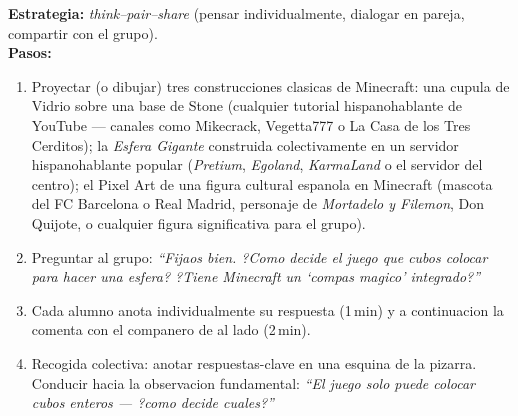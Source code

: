 \documentclass[12pt,a4paper]{scrartcl}
\newcommand{\tempo}[1]{\textnormal{\footnotesize\color{bg!90!white}\textsf{#1}}}
\begin{document}
\begin{actividad}[1.1 --- Movilizacion \quad\tempo{10 min}]
\textbf{Estrategia:} \emph{think--pair--share} (pensar individualmente, dialogar en pareja, compartir con el grupo). \\[0.4em]
\textbf{Pasos:}
\begin{enumerate}[leftmargin=1.5em,itemsep=0.2em,topsep=0.3em,nosep]
  \item Proyectar (o dibujar) tres construcciones clasicas de Minecraft: una cupula de Vidrio sobre una base de Stone (cualquier tutorial hispanohablante de YouTube --- canales como Mikecrack, Vegetta777 o La Casa de los Tres Cerditos); la \emph{Esfera Gigante} construida colectivamente en un servidor hispanohablante popular (\emph{Pretium}, \emph{Egoland}, \emph{KarmaLand} o el servidor del centro); el Pixel Art de una figura cultural espanola en Minecraft (mascota del FC Barcelona o Real Madrid, personaje de \emph{Mortadelo y Filemon}, Don Quijote, o cualquier figura significativa para el grupo).
  \item Preguntar al grupo: \emph{\enquote{Fijaos bien. ?Como decide el juego que cubos colocar para hacer una esfera? ?Tiene Minecraft un \enquote{compas magico} integrado?}}
  \item Cada alumno anota individualmente su respuesta (1\,min) y a continuacion la comenta con el companero de al lado (2\,min).
  \item Recogida colectiva: anotar respuestas-clave en una esquina de la pizarra. Conducir hacia la observacion fundamental: \emph{\enquote{El juego solo puede colocar cubos enteros --- ?como decide cuales?}}
\end{enumerate}
\end{actividad}
\end{document}

